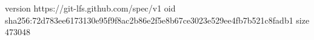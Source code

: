 version https://git-lfs.github.com/spec/v1
oid sha256:72d783ee6173130e95f9f8ac2b86e2f5e8b67ce3023e529ee4fb7b521c8fadb1
size 473048
